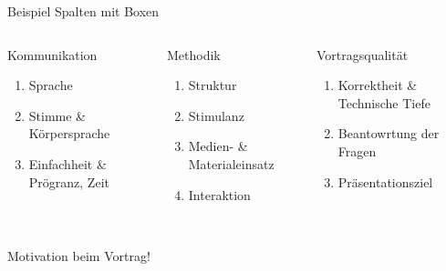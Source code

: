 \documentclass[aspectratio=169,xcolor=dvipsnames, t]{beamer}
\begin{document}
\begin{frame}{Beispiel Spalten mit Boxen}
	\begin{columns}
		\begin{column}{0.3\textwidth}
			\begin{block}{Kommunikation}
				\begin{enumerate}
					\item Sprache
					\item Stimme \& K\"orpersprache
					\item Einfachheit \& Pr\"ogranz, Zeit
				\end{enumerate}
			\end{block}
		\end{column}
		\pause
		\begin{column}{0.3\textwidth}
			\begin{block}{Methodik}
				\begin{enumerate}
					\item Struktur
					\item Stimulanz
					\item Medien- \& Materialeinsatz
					\item Interaktion
				\end{enumerate}
			\end{block}
		\end{column}
		\pause
		\begin{column}{0.3\textwidth}
			\begin{block}{Vortragsqualit\"at}
				\begin{enumerate}
					\item Korrektheit \& Technische Tiefe
					\item Beantowrtung der Fragen
					\item Pr\"asentationsziel
				\end{enumerate}
			\end{block}
		\end{column}
	\end{columns} ~\\
	Motivation beim Vortrag!
\end{frame}
\end{document}
